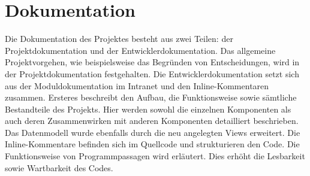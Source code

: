 \section{Dokumentation}
\label{sec:Dokumentation}

Die Dokumentation des Projektes besteht aus zwei Teilen: der Projektdokumentation und der Entwicklerdokumentation. Das allgemeine Projektvorgehen, wie beispielsweise das Begründen von Entscheidungen, wird in der Projektdokumentation festgehalten.
Die Entwicklerdokumentation setzt sich aus der Moduldokumentation im Intranet und den Inline-Kommentaren zusammen. Ersteres beschreibt den Aufbau, die Funktionsweise sowie sämtliche Bestandteile des Projekts. Hier werden sowohl die einzelnen Komponenten als auch deren Zusammenwirken mit anderen Komponenten detailliert beschrieben. Das Datenmodell wurde ebenfalls durch die neu angelegten Views erweitert. Die Inline-Kommentare befinden sich im Quellcode und strukturieren den Code. Die Funktionsweise von Programmpassagen wird erläutert. Dies erhöht die Lesbarkeit sowie Wartbarkeit des Codes. 

